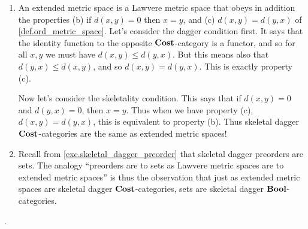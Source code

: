 \documentclass[7Sketches]{subfiles}
\begin{document}
{
\begin{enumerate}
	\item An extended metric space is a Lawvere metric space that obeys in
	addition the properties (b) if $d(x,y)=0$ then $x=y$, and (c)
	$d(x,y)=d(y,x)$ of \cref{def.ord_metric_space}. Let's consider the
	dagger condition first. It says that the identity function to the
	opposite $\mathbf{Cost}$-category is a functor, and so for all $x,y$ we must
	have $d(x,y) \le d(y,x)$. But this means also that $d(y,x) \le d(x,y)$,
	and so $d(x,y)=d(y,x)$. This is exactly property (c).

	Now let's consider the skeletality condition. This says that if $d(x,y)=0$
	and $d(y,x)=0$, then $x=y$. Thus when we have property (c),
	$d(x,y)=d(y,x)$, this is equivalent to property (b). Thus skeletal
	dagger $\mathbf{Cost}$-categories are the same as extended metric spaces!
	\item Recall from \cref{exc.skeletal_dagger_preorder} that skeletal
	dagger preorders are sets. The analogy ``preorders are to sets as
	Lawvere metric spaces are to extended metric spaces'' is thus the
	observation that just as extended metric spaces are skeletal dagger
	$\mathbf{Cost}$-categories, sets are skeletal dagger $\mathbf{Bool}$-categories. 	
\end{enumerate}
.
}
\end{document}
